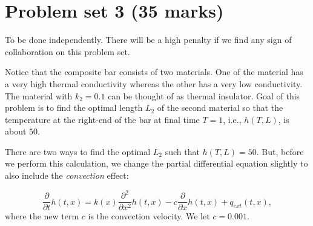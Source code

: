 \documentclass[11pt,a4paper]{article}
\newcommand{\p}{\partial }
\begin{document}
\section{Problem set 3 (35 marks)}
{\color{red} To be done independently. There will be a high penalty if we find any sign of collaboration on this problem set.}

\noindent Notice that the composite bar consists of two materials. One of the material has a very high thermal conductivity whereas the other has a very low conductivity. The material with $k_2 = 0.1$ can be thought of as thermal insulator. Goal of this problem is to find the optimal length $L_2$ of the second material so that the temperature at the right-end of the bar at final time $T = 1$, i.e., $h(T, L)$, is about $50$. 

There are two ways to find the optimal $L_2$ such that $h(T, L) = 50$. But, before we perform this calculation, we change the partial differential equation slightly to also include the {\it convection} effect:

\begin{equation}\label{eq:pde2}
\frac{\p}{\p t} h(t, x) = k(x) \frac{\p^2 }{\p x^2} h(t, x) - c \frac{\p }{\p x} h(t, x) + q_{ext}(t, x),
\end{equation}
where the new term $c$ is the convection velocity. We let $c = 0.001$. 
\end{document}
